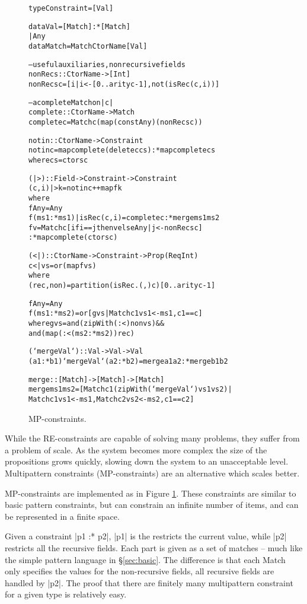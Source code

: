 \documentclass[preprint]{sigplanconf}
\newcommand{\C}[1]{\textsf{#1}}
\newenvironment{code}{\begin{alltt}\small}{\end{alltt}}
\begin{document}
\begin{figure}
\begin{code}
type Constraint = [Val]

data Val    =  [Match] :* [Match]
            |  Any
data Match  =  Match CtorName [Val]

-- useful auxiliaries, non recursive fields
nonRecs :: CtorName -> [Int]
nonRecs c = [i | i <- [0..arity c-1], not (isRec (c,i))]

-- a complete Match on |c|
complete :: CtorName -> Match
complete c = Match c (map (const Any) (nonRecs c))

notin :: CtorName -> Constraint
notin c = map complete (delete c cs) :* map complete cs
    where cs = ctors c

(|>) :: Field -> Constraint -> Constraint
(c,i) |> k = notin c ++ map f k
    where
    f Any = Any
    f (ms1 :* ms1) | isRec (c,i) = complete c :* merge ms1 ms2
    f v =  Match c [if i == j then v else Any | j <- nonRecs c]
           :* map complete (ctors c)

(<|) :: CtorName -> Constraint -> Prop (Req Int)
c <| vs = or (map f vs)
    where
    (rec,non) = partition (isRec . (,) c) [0..arity c-1]

    f Any = Any
    f (ms1 :* ms2) = or [g vs | Match c1 vs1 <- ms1, c1 == c]
        where g vs =  and (zipWith (:<) non vs) &&
                      and (map (:< (ms2 :* ms2)) rec)

(`mergeVal`) :: Val -> Val -> Val
(a1 :* b1) `mergeVal` (a2 :* b2) = merge a1 a2 :* merge b1 b2

merge :: [Match] -> [Match] -> [Match]
merge  ms1 ms2 = [Match c1 (zipWith (`mergeVal`) vs1 vs2) |
       Match c1 vs1 <- ms1, Match c2 vs2 <- ms2, c1 == c2]
\end{code}
\caption{MP-constraints.}
\label{fig:enumeration}
\end{figure}

While the RE-constraints are capable of solving many problems, they suffer from a problem of scale. As the system becomes more complex the size of the propositions grows quickly, slowing down the system to an unacceptable level. Multipattern constraints (MP-constraints) are an alternative which scales better.

MP-constraints are implemented as in Figure \ref{fig:enumeration}. These constraints are similar to basic pattern constraints, but can constrain an infinite number of items, and can be represented in a finite space.

Given a constraint |p1 :* p2|, |p1| is the restricts the current value, while |p2| restricts all the recursive fields. Each part is given as a set of matches -- much like the simple pattern language in \S\ref{sec:basic}. The difference is that each \C{Match} only specifies the values for the non-recursive fields, all recursive fields are handled by |p2|. The proof that there are finitely many multipattern constraint for a given type is relatively easy.
\end{document}
